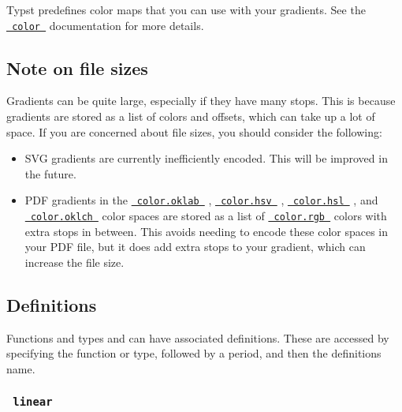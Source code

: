 Typst predefines color maps that you can use with your gradients. See
the
\href{/docs/reference/visualize/color/\#predefined-color-maps}{\texttt{\ color\ }}
documentation for more details.

\subsection{Note on file sizes}\label{note-on-file-sizes}

Gradients can be quite large, especially if they have many stops. This
is because gradients are stored as a list of colors and offsets, which
can take up a lot of space. If you are concerned about file sizes, you
should consider the following:

\begin{itemize}
\tightlist
\item
  SVG gradients are currently inefficiently encoded. This will be
  improved in the future.
\item
  PDF gradients in the
  \href{/docs/reference/visualize/color/\#definitions-oklab}{\texttt{\ color.oklab\ }}
  ,
  \href{/docs/reference/visualize/color/\#definitions-hsv}{\texttt{\ color.hsv\ }}
  ,
  \href{/docs/reference/visualize/color/\#definitions-hsl}{\texttt{\ color.hsl\ }}
  , and
  \href{/docs/reference/visualize/color/\#definitions-oklch}{\texttt{\ color.oklch\ }}
  color spaces are stored as a list of
  \href{/docs/reference/visualize/color/\#definitions-rgb}{\texttt{\ color.rgb\ }}
  colors with extra stops in between. This avoids needing to encode
  these color spaces in your PDF file, but it does add extra stops to
  your gradient, which can increase the file size.
\end{itemize}

\subsection{\texorpdfstring{{ Definitions
}}{ Definitions }}\label{definitions}

\label{definitions-tooltip}
Functions and types and can have associated definitions. These are
accessed by specifying the function or type, followed by a period, and
then the definition\textquotesingle s name.

\subsubsection{\texorpdfstring{\texttt{\ linear\ }}{ linear }}\label{definitions-linear}

